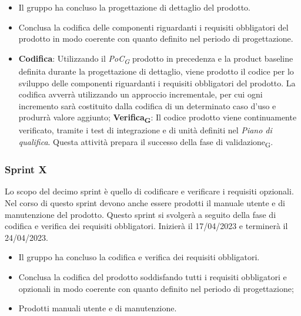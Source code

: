 \:
\begin{itemize}
	\item Il gruppo ha concluso la progettazione di dettaglio del prodotto.
\end{itemize}

\:
\begin{itemize}
	\item Conclusa la codifica delle componenti riguardanti i requisiti obbligatori del prodotto in modo coerente con quanto definito nel periodo di progettazione.
\end{itemize}

\:
\begin{itemize}
	\item \textbf{Codifica}: Utilizzando il \textit{PoC\textsubscript{G}} prodotto in precedenza e la product baseline definita durante la progettazione di dettaglio, viene prodotto il codice per lo sviluppo delle componenti riguardanti i requisiti obbligatori del prodotto. La codifica avverrà utilizzando un approccio incrementale, per cui ogni incremento sarà costituito dalla codifica di un determinato caso d’uso e produrrà valore aggiunto;
	\subitem \textbf{Verifica\textsubscript{G}}: Il codice prodotto viene continuamente verificato, tramite i test di integrazione e di unità definiti nel \textit{Piano di qualifica}. Questa attività prepara il successo della fase di validazione\textsubscript{G}.
\end{itemize}

\subsubsection{Sprint X}
Lo scopo del decimo sprint è quello di codificare e verificare i requisiti opzionali. Nel corso di questo sprint devono anche essere prodotti il manuale utente e di manutenzione del prodotto.
Questo sprint si svolgerà a seguito della fase di codifica e verifica dei requisiti obbligatori. Inizierà il 17/04/2023 e terminerà il 24/04/2023.

\:
\begin{itemize}
	\item Il gruppo ha concluso la codifica e verifica dei requisiti obbligatori.
\end{itemize}

\:
\begin{itemize}
	\item Conclusa la codifica del prodotto soddisfando tutti i requisiti obbligatori e opzionali in modo coerente con quanto definito nel periodo di progettazione;
	\item Prodotti manuali utente e di manutenzione.
\end{itemize}

